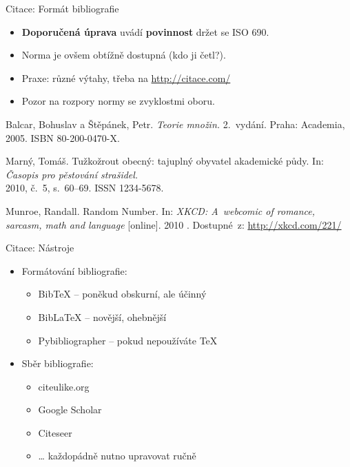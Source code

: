 \documentclass{beamer}
\begin{document}
\begin{frame}{Citace: Formát bibliografie}

\begin{itemize}
\item {\bf Doporučená úprava\/} uvádí {\bf povinnost\/} držet se ISO 690.
\item Norma je ovšem obtížně dostupná (kdo ji četl?).
\item Praxe: různé výtahy, třeba na \url{http://citace.com/}
\item Pozor na rozpory normy se zvyklostmi oboru.
\end{itemize}

\vfill

{\sc Balcar}, Bohuslav a {\sc Štěpánek}, Petr. {\it Teorie množin.\/}
2.~vydání. Praha: Academia, 2005. ISBN 80-200-0470-X.

\medskip

{\sc Marný}, Tomáš. Tužkožrout obecný: tajuplný obyvatel akademické půdy.
In: {\it Časopis pro pěstování strašidel.} \\
2010, č.~5, s.~60--69. ISSN 1234-5678.

\medskip

{\sc Munroe,} Randall. Random Number.
In: {\it XKCD: A~webcomic of romance, sarcasm, math and language\/} [online].
2010 \hfil\break
[cit. 2011-10-04]. Dostupné~z: \url{http://xkcd.com/221/}
\end{frame}

\begin{frame}{Citace: Nástroje}

\begin{itemize}
\item Formátování bibliografie:
   \begin{itemize}
   \item Bib\TeX{} -- poněkud obskurní, ale účinný
   \item Bib\LaTeX{} -- novější, ohebnější
   \item Pybibliographer -- pokud nepoužíváte \TeX
   \end{itemize}
\bigskip
\item Sběr bibliografie:
   \begin{itemize}
   \item citeulike.org
   \item Google Scholar
   \item Citeseer
   \item \dots{} každopádně nutno upravovat ručně
   \end{itemize}
\end{itemize}

\end{frame}
\end{document}
